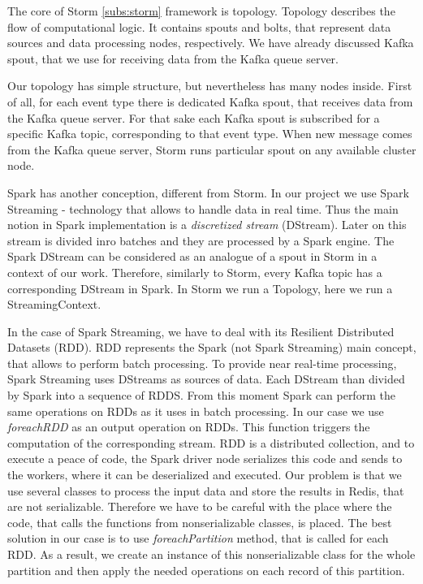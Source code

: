 The core of Storm \ref{subs:storm} framework is topology.
Topology describes the flow of computational logic.
It contains spouts and bolts, that represent data sources and data processing nodes, respectively.
We have already discussed Kafka spout, that we use for receiving data from the Kafka queue server.

Our topology has simple structure, but nevertheless has many nodes inside.
First of all, for each event type there is dedicated Kafka spout, that receives data from the Kafka queue server.
For that sake each Kafka spout is subscribed for a specific Kafka topic, corresponding to that event type.
When new message comes from the Kafka queue server, Storm runs particular spout on any available cluster node.

Spark has another conception, different from Storm.
In our project we use Spark Streaming - technology that allows to handle data in real time.
Thus the main notion in Spark implementation is a \textit{discretized stream} (DStream).
Later on this stream is divided inro batches and they are processed by a Spark engine.
The Spark DStream can be considered as an analogue of a spout in Storm in a context of our work.
Therefore, similarly to Storm, every Kafka topic has a corresponding DStream in Spark.
In Storm we run a Topology, here we run a StreamingContext.

In the case of Spark Streaming, we have to deal with its Resilient Distributed Datasets (RDD).
RDD represents the Spark (not Spark Streaming) main concept, that allows to perform batch processing.
To provide near real-time processing, Spark Streaming uses DStreams as sources of data.
Each DStream than divided by Spark into a sequence of RDDS.
From this moment Spark can perform the same operations on RDDs as it uses in batch processing.
In our case we use \textit{foreachRDD} as an output operation on RDDs.
This function triggers the computation of the corresponding stream.
RDD is a distributed collection, and to execute a peace of code, the Spark driver node serializes this code and sends to the workers, where it can be deserialized and executed.
Our problem is that we use several classes to process the input data and store the results in Redis, that are not serializable.
Therefore we have to be careful with the place where the code, that calls the functions from nonserializable classes, is placed.
The best solution in our case is to use \textit{foreachPartition} method, that is called for each RDD.
As a result, we create an instance of this nonserializable class for the whole partition and then apply the needed operations on each record of this partition. 

